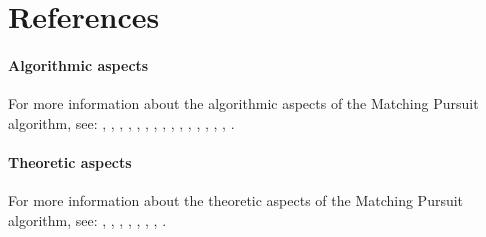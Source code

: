 \documentclass[11pt,a4paper]{article}
\begin{document}
\clearpage
\section{References}
\paragraph{Algorithmic aspects} For more information about the algorithmic
aspects of the Matching Pursuit algorithm, see: \newline \cite{Zhang93},
\cite{MZ93}, \cite{PRK93}, \cite{Davis94}, \cite{Bergeaud},
\cite{BM96}, \linebreak \cite{HRP}, \cite{HRMP1}, \cite{HRMP2}, \cite{DMA97},
\cite{goodwin99:_match}, \cite{MaThese}, \cite{Grib2001},
\cite{Grib2002a}, \cite{gribonval03:_harmon_decom_audio_signal_match_pursuit},
\cite{SPIE03:GribA}.

\paragraph{Theoretic aspects} For more information about the theoretic aspects
of the Matching Pursuit algorithm, see: \newline
\cite{Grib2001b}, \cite{GN2001}, \cite{Grib2001c}, \cite{ICIP03:GN},
\cite{gribonval03:_spars}, \cite{IRISA03:GV}, \cite{gribonval03:_highl},
\cite{GribFig}.


{
}
\end{document}

